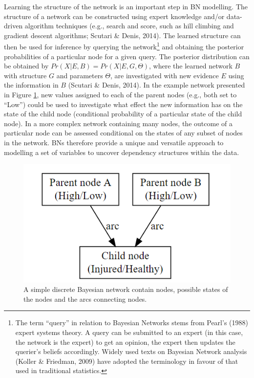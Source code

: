 \documentclass[man,floatsintext]{apa6}
\let\rmarkdownfootnote\footnote%
\def\footnote{\protect\rmarkdownfootnote}
\begin{document}
Learning the structure of the network is an important step in BN modelling. The structure of a network can be constructed using expert knowledge and/or data-driven algorithm techniques (e.g., search and score, such as hill climbing and gradient descent algorithms; Scutari \& Denis, 2014).
The learned structure can then be used for inference by querying the network\footnote{The term \enquote{query} in relation to Bayesian Networks stems from Pearl's (1988) expert systems theory. A query can be submitted to an expert (in this case, the network is the expert) to get an opinion, the expert then updates the querier's beliefs accordingly. Widely used texts on Bayesian Network analysis (Koller \& Friedman, 2009) have adopted the terminology in favour of that used in traditional statistics.} and obtaining the posterior probabilities of a particular node for a given query.
The posterior distribution can be obtained by \(Pr(X|E,B) = Pr(X|E,G,\Theta)\), where the learned network \(B\) with structure \(G\) and parameters \(\Theta\), are investigated with new evidence \(E\) using the information in \(B\) (Scutari \& Denis, 2014).
In the example network presented in Figure \ref{fig:examplenetwork}, new values assigned to each of the parent nodes (e.g., both set to \enquote{Low}) could be used to investigate what effect the new information has on the state of the child node (conditional probability of a particular state of the child node).
In a more complex network containing many nodes, the outcome of a particular node can be assessed conditional on the states of any subset of nodes in the network.
BNs therefore provide a unique and versatile approach to modelling a set of variables to uncover dependency structures within the data.

\begin{figure}[H]

{\centering \includegraphics[width=0.5\linewidth]{figs/study1/examplenetwork} 

}

\caption{A simple discrete Bayesian network contain nodes, possible states of the nodes and the arcs connecting nodes.}\label{fig:examplenetwork}
\end{figure}
\end{document}
